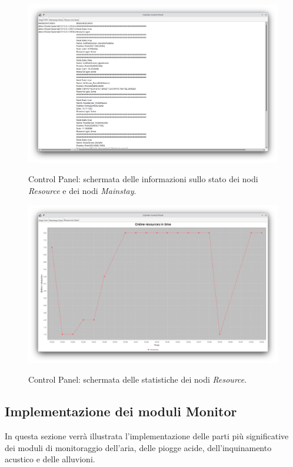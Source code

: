 \documentclass[12pt]{article}
\begin{document}
\begin{figure}[H]
    \caption{Control Panel: schermata delle informazioni sullo stato dei nodi \textit{Resource} e dei nodi \textit{Mainstay}.}
    \includegraphics[width=\textwidth]{../assets/images/control-panel-info.png}
    \label{fig:control-panel-info}
\end{figure}

\begin{figure}[H]
    \caption{Control Panel: schermata delle statistiche dei nodi \textit{Resource}.}
    \includegraphics[width=\textwidth]{../assets/images/control-panel-resources-stats.png}
    \label{fig:control-panel-resources-stats}
\end{figure}

\subsection{Implementazione dei moduli Monitor}
In questa sezione verrà illustrata l'implementazione delle parti più significative dei moduli di monitoraggio dell'aria, delle piogge acide, dell'inquinamento acustico e delle alluvioni.
\end{document}
